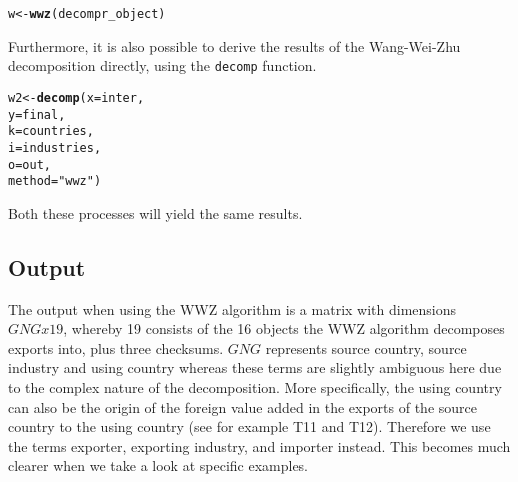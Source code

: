 \documentclass[a4paper,11pt]{article}
\makeatletter
\newcommand{\hlstr}[1]{\textcolor[rgb]{0.192,0.494,0.8}{#1}}%
\newcommand{\hlstd}[1]{\textcolor[rgb]{0.345,0.345,0.345}{#1}}%
\newcommand{\hlkwb}[1]{\textcolor[rgb]{0.69,0.353,0.396}{#1}}%
\newcommand{\hlkwc}[1]{\textcolor[rgb]{0.333,0.667,0.333}{#1}}%
\newcommand{\hlkwd}[1]{\textcolor[rgb]{0.737,0.353,0.396}{\textbf{#1}}}%
\newenvironment{kframe}{%
 \def\at@end@of@kframe{}%
 \ifinner\ifhmode%
  \def\at@end@of@kframe{\end{minipage}}%
  \begin{minipage}{\columnwidth}%
 \fi\fi%
 \def\FrameCommand##1{\hskip\@totalleftmargin \hskip-\fboxsep
 \colorbox{shadecolor}{##1}\hskip-\fboxsep
     \hskip-\linewidth \hskip-\@totalleftmargin \hskip\columnwidth}%
 \MakeFramed {\advance\hsize-\width
   \@totalleftmargin\z@ \linewidth\hsize
   \@setminipage}}%
 {\par\unskip\endMakeFramed%
 \at@end@of@kframe}
\newenvironment{knitrout}{}{} %
\makeatother
\begin{document}
\begin{knitrout}
\color{fgcolor}\begin{kframe}
\begin{alltt}
\hlstd{w} \hlkwb{<-} \hlkwd{wwz}\hlstd{(decompr_object)}
\end{alltt}
\end{kframe}
\end{knitrout}

Furthermore, it is also possible to derive the results of the Wang-Wei-Zhu decomposition directly, using the \verb!decomp! function.

\begin{knitrout}
\color{fgcolor}\begin{kframe}
\begin{alltt}
\hlstd{w2} \hlkwb{<-}  \hlkwd{decomp}\hlstd{(} \hlkwc{x} \hlstd{= inter,}
               \hlkwc{y} \hlstd{= final,}
               \hlkwc{k} \hlstd{= countries,}
               \hlkwc{i} \hlstd{= industries,}
               \hlkwc{o} \hlstd{= out,}
               \hlkwc{method} \hlstd{=} \hlstr{"wwz"} \hlstd{)}
\end{alltt}
\end{kframe}
\end{knitrout}

Both these processes will yield the same results.

\subsection{Output}
The output when using the WWZ algorithm is a matrix with dimensions $GNGx19$, 
whereby 19 consists of the 16 objects the WWZ algorithm decomposes exports into, plus three checksums. 
$GNG$ represents source country, source industry and using country whereas these terms are slightly ambiguous here due to the complex nature of the decomposition. 
More specifically, the using country can also be the origin of the foreign value added in the exports of the source country to the using country (see for example T11 and T12). 
Therefore we use the terms exporter, exporting industry, and importer instead. 
This becomes much clearer when we take a look at specific examples.
\end{document}
